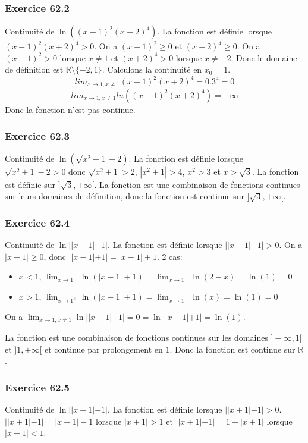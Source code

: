 \documentclass[]{book}
\theoremstyle{definition}
\newcommand{\bb}[1]{\mathbb{#1}}
\newcommand{\R}{\bb{R}}
\begin{document}
\subsubsection*{Exercice 62.2}
Continuit\'e de $\ln((x - 1)^2(x + 2)^4)$. La fonction est d\'efinie lorsque $(x - 1)^2(x + 2)^4 > 0$. On a $(x - 1)^2 \geq 0$ et $(x + 2)^4 \geq 0$. On a $(x - 1)^2 > 0$ lorsque $x \neq 1$ et $(x + 2)^4 > 0$ lorsque $x \neq -2$. Donc le domaine de d\'efinition est $\R \setminus \{-2,1\}$.
Calculons la continuit\'e en $x_0 = 1$.
$$lim_{x \to 1, x\neq 1} (x - 1)^2(x + 2)^4 = 0.3^4 = 0$$
$$lim_{x \to 1, x\neq 1} ln((x - 1)^2(x + 2)^4) = -\infty$$
Donc la fonction n'est pas continue.

\subsubsection*{Exercice 62.3}
Continuit\'e de $\ln(\sqrt{x^2+1}-2)$. La fonction est d\'efinie lorsque $\sqrt{x^2+1}-2 > 0$ donc $\sqrt{x^2+1}> 2$, $|x^2+1|> 4$, $x^2> 3$ et $x > \sqrt{3}$. La fonction est d\'efinie sur $]\sqrt{3},+\infty[$. La fonction est une combinaison de fonctions continues sur leurs domaines de d\'efinition, donc la fonction est continue sur $]\sqrt{3}, +\infty[$.

\subsubsection*{Exercice 62.4}
Continuit\'e de $\ln||x-1|+1|$. La fonction est d\'efinie lorsque $||x-1|+1| > 0$. On a $|x-1| \geq 0$, donc $||x-1|+1| = |x-1|+1$.
2 cas:
\begin{itemize}
\item $x < 1$, $\lim_{x \to 1^{-}} \ln(|x-1|+1) = \lim_{x \to 1^{-}} \ln(2-x) = \ln(1) = 0$
\item $x > 1$, $\lim_{x \to 1^{+}} \ln(|x-1|+1) = \lim_{x \to 1^{+}} \ln(x) = \ln(1) = 0$
\end{itemize}
On a $\lim_{x \to 1, x \neq 1} \ln||x-1|+1| = 0 = \ln||x-1|+1| = \ln(1)$.

La fonction est une combinaison de fonctions continues sur les domaines $]-\infty,1[$ et $]1,+\infty[$ et continue par prolongement en $1$. Donc la fonction est continue sur $\R$.  

\subsubsection*{Exercice 62.5}
Continuit\'e de $\ln||x+1|-1|$. La fonction est d\'efinie lorsque $||x+1|-1| > 0$. \\
$||x+1|-1| = |x+1|-1$ lorsque $|x+1| > 1$ et $||x+1|-1| = 1-|x+1|$ lorsque $|x+1| < 1$. \\
\end{document}
